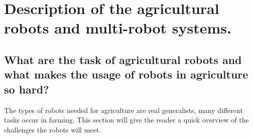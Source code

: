     




    
   





    \chapter{Description of the agricultural robots and multi-robot systems.}

    \section{What are the task of agricultural robots and what makes the usage of robots in agriculture so hard?}


    The types of robots needed for agriculture are real generalists, many different tasks occur in farming. This section will give the reader a quick overview of the challenges the robots will meet.

